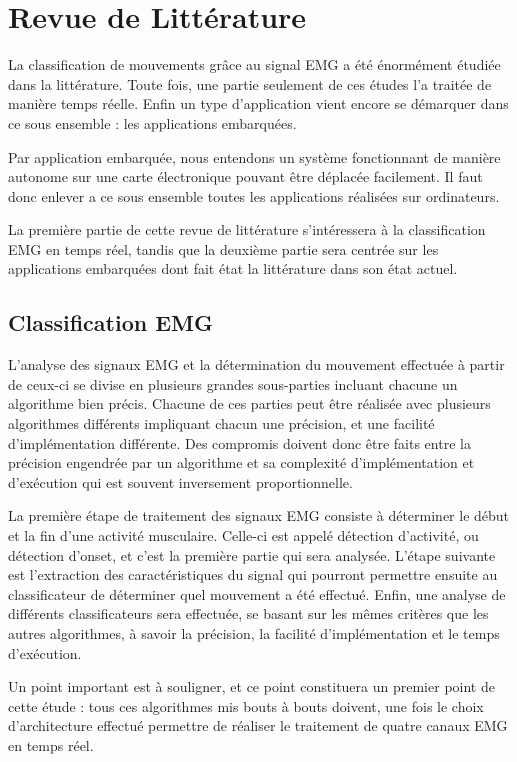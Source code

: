 \documentclass[letterpaper, twoside, 12pt, memoire, creativecommons, hyperref]{thETS}
\begin{document}
\chapter{Revue de Littérature}

La classification de mouvements grâce au signal EMG a été énormément étudiée dans la littérature. Toute fois, une partie seulement de ces études l'a traitée de manière temps réelle. Enfin un type d'application vient encore se démarquer dans ce sous ensemble : les applications embarquées. 

Par application embarquée, nous entendons un système fonctionnant de manière autonome sur une carte électronique pouvant être déplacée facilement. Il faut donc enlever a ce sous ensemble toutes les applications réalisées sur ordinateurs. 

La première partie de cette revue de littérature s’intéressera à la classification EMG en temps réel, tandis que la deuxième partie sera centrée sur les applications embarquées dont fait état la littérature dans son état actuel.

\section{Classification EMG}

L’analyse des signaux EMG et la détermination du mouvement effectuée à partir de ceux-ci se divise en plusieurs grandes sous-parties incluant chacune un algorithme bien précis. Chacune de ces parties peut être réalisée avec plusieurs algorithmes différents impliquant chacun une précision, et une facilité d’implémentation différente. Des compromis doivent donc être faits entre la précision engendrée par un algorithme et sa complexité d’implémentation et d’exécution qui est souvent inversement proportionnelle. 

La première étape de traitement des signaux EMG consiste à déterminer le début et la fin d'une activité musculaire. Celle-ci est appelé détection d’activité, ou détection d'onset, et c’est la première partie qui sera analysée. L’étape suivante est l’extraction des caractéristiques du signal qui pourront permettre ensuite au classificateur de déterminer quel mouvement a été effectué. Enfin, une analyse de différents classificateurs sera effectuée, se basant sur les mêmes critères que les autres algorithmes, à savoir la précision, la facilité d’implémentation et le temps d’exécution. 

Un point important est à souligner, et ce point constituera un premier point de cette étude : tous ces algorithmes mis bouts à bouts doivent, une fois le choix d’architecture effectué permettre de réaliser le traitement de quatre canaux EMG en temps réel.
\end{document}
